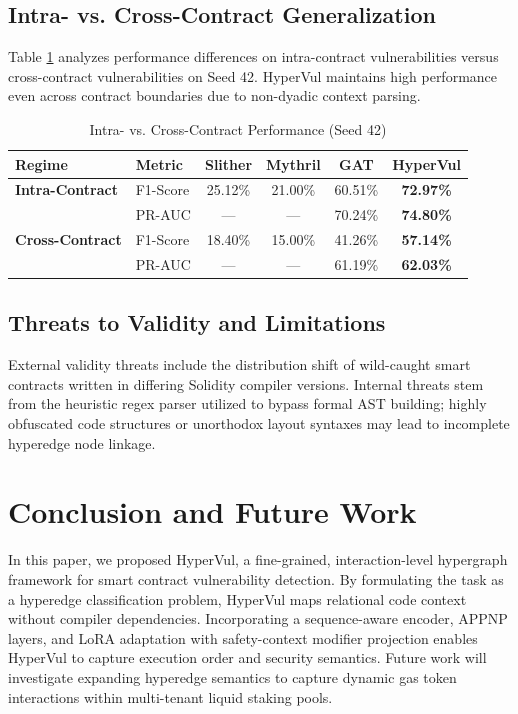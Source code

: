 \documentclass[conference]{IEEEtran}
\begin{document}
\subsection{Intra- vs. Cross-Contract Generalization}
Table \ref{tab:generalization} analyzes performance differences on intra-contract vulnerabilities versus cross-contract vulnerabilities on Seed 42. HyperVul maintains high performance even across contract boundaries due to non-dyadic context parsing.

\begin{table}[h]
\centering
\caption{Intra- vs. Cross-Contract Performance (Seed 42)}
\label{tab:generalization}
\begin{tabular}{llcccc}
\toprule
\textbf{Regime} & \textbf{Metric} & \textbf{Slither} & \textbf{Mythril} & \textbf{GAT} & \textbf{HyperVul} \\
\midrule
\textbf{Intra-Contract} & F1-Score & 25.12\% & 21.00\% & 60.51\% & \textbf{72.97\%} \\
& PR-AUC & — & — & 70.24\% & \textbf{74.80\%} \\
\midrule
\textbf{Cross-Contract} & F1-Score & 18.40\% & 15.00\% & 41.26\% & \textbf{57.14\%} \\
& PR-AUC & — & — & 61.19\% & \textbf{62.03\%} \\
\bottomrule
\end{tabular}
\end{table}

\subsection{Threats to Validity and Limitations}
External validity threats include the distribution shift of wild-caught smart contracts written in differing Solidity compiler versions. Internal threats stem from the heuristic regex parser utilized to bypass formal AST building; highly obfuscated code structures or unorthodox layout syntaxes may lead to incomplete hyperedge node linkage.

\section{Conclusion and Future Work}
In this paper, we proposed HyperVul, a fine-grained, interaction-level hypergraph framework for smart contract vulnerability detection. By formulating the task as a hyperedge classification problem, HyperVul maps relational code context without compiler dependencies. Incorporating a sequence-aware encoder, APPNP layers, and LoRA adaptation with safety-context modifier projection enables HyperVul to capture execution order and security semantics. Future work will investigate expanding hyperedge semantics to capture dynamic gas token interactions within multi-tenant liquid staking pools.
\end{document}
